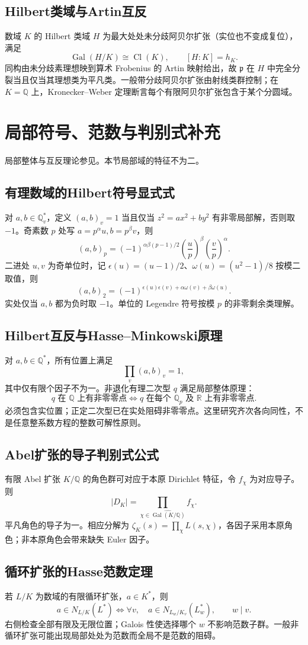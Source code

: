 \documentclass[../main.tex]{subfiles}
\begin{document}
\subsection{Hilbert类域与Artin互反}
数域 $K$ 的 Hilbert 类域 $H$ 为最大处处未分歧阿贝尔扩张（实位也不变成复位），满足
\[
\operatorname{Gal}(H/K)\cong\operatorname{Cl}(K),\qquad[H:K]=h_K.
\]
同构由未分歧素理想映到算术 Frobenius 的 Artin 映射给出，故 $\mathfrak p$ 在 $H$ 中完全分裂当且仅当其理想类为平凡类。一般带分歧阿贝尔扩张由射线类群控制；在 $K=\mathbb Q$ 上，Kronecker--Weber 定理断言每个有限阿贝尔扩张包含于某个分圆域。

\section{局部符号、范数与判别式补充}
局部整体与互反理论参见\cite{milneANT,milneCFT}。本节局部域的特征不为二。
\subsection{有理数域的Hilbert符号显式式}
对 $a,b\in\mathbb Q_v^*$，定义 $(a,b)_v=1$ 当且仅当 $z^2=ax^2+by^2$ 有非零局部解，否则取 $-1$。奇素数 $p$ 处写 $a=p^\alpha u,b=p^\beta v$，则
\[
(a,b)_p=(-1)^{\alpha\beta(p-1)/2}
\left(\frac{u}{p}\right)^\beta\left(\frac{v}{p}\right)^\alpha.
\]
二进处 $u,v$ 为奇单位时，记 $\epsilon(u)=(u-1)/2$、$\omega(u)=(u^2-1)/8$ 按模二取值，则
\[
(a,b)_2=(-1)^{\epsilon(u)\epsilon(v)+\alpha\omega(v)+\beta\omega(u)}.
\]
实处仅当 $a,b$ 都为负时取 $-1$。单位的 Legendre 符号按模 $p$ 的非零剩余类理解。
\subsection{Hilbert互反与Hasse--Minkowski原理}
对 $a,b\in\mathbb Q^*$，所有位置上满足
\[
\prod_v(a,b)_v=1,
\]
其中仅有限个因子不为一。非退化有理二次型 $q$ 满足局部整体原理：
\[
q\text{ 在 }\mathbb Q\text{ 上有非零零点}
\iff q\text{ 在每个 }\mathbb Q_p\text{ 及 }\mathbb R\text{ 上有非零零点}.
\]
必须包含实位置；正定二次型已在实处阻碍非零零点。这里研究齐次各向同性，不是任意整系数方程的整数可解性原则。
\subsection{Abel扩张的导子判别式公式}
有限 Abel 扩张 $K/\mathbb Q$ 的角色群可对应于本原 Dirichlet 特征，令 $f_\chi$ 为对应导子。则
\[
|D_K|=\prod_{\chi\in\widehat{\operatorname{Gal}(K/\mathbb Q)}}f_\chi.
\]
平凡角色的导子为一。相应分解为 $\zeta_K(s)=\prod_\chi L(s,\chi)$，各因子采用本原角色；非本原角色会带来缺失 Euler 因子。
\subsection{循环扩张的Hasse范数定理}
若 $L/K$ 为数域的有限循环扩张，$a\in K^*$，则
\[
a\in N_{L/K}(L^*)
\iff \forall v,\quad a\in N_{L_w/K_v}(L_w^*),\qquad w\mid v.
\]
右侧检查全部有限及无限位置；Galois 性使选择哪个 $w$ 不影响范数子群。一般非循环扩张可能出现局部处处为范数而全局不是范数的阻碍。
\clearpage
\end{document}
